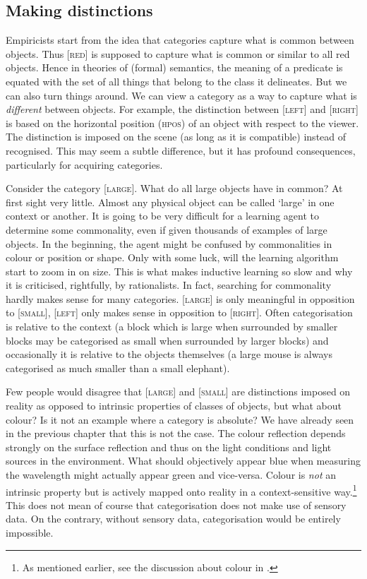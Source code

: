 \subsection{Making distinctions}

Empiricists start from the idea that categories 
capture what is common
between objects. Thus [\textsc{red}] is supposed to capture 
what is common or similar to all 
red objects. Hence in theories of 
(formal) semantics, the meaning of a predicate is 
equated with the set of all things that 
belong to the class it delineates. 
But we can also turn things around. We can 
view a category as a way to capture what is {\itshape different} 
between objects. For example, the distinction between 
[\textsc{left}] and [\textsc{right}] is based on the horizontal position (\textsc{hpos})
of an object with respect to the viewer. 
The distinction is imposed on the scene (as long as 
it is compatible) instead of 
recognised. This may seem a subtle difference, but it
has profound consequences, particularly for acquiring
categories.

Consider the category [\textsc{large}]. What do all large 
objects have in common? At first sight very little. 
Almost any physical object can be called `large' in 
one context or another. 
It is going to be very difficult for a learning agent
to determine some commonality, even if given thousands 
of examples of large objects. In the beginning, the agent
might be confused by commonalities in 
colour or position or shape. 
Only with some luck, will the learning algorithm
start to zoom in on size. 
This is what makes inductive learning so slow and 
why it is criticised, rightfully, by rationalists. 
In fact, searching for commonality hardly makes sense for
many categories. [\textsc{large}] is only meaningful in
opposition to [\textsc{small}], [\textsc{left}] only makes sense
in opposition to [\textsc{right}]. Often categorisation
is relative to the context (a block which is large when surrounded
by smaller blocks may be categorised as
small when surrounded by larger
blocks) and occasionally it is relative to the objects themselves
(a large mouse is always categorised as
much smaller than a small elephant). 

Few people would disagree that [\textsc{large}] and [\textsc{small}] are
distinctions imposed on reality as opposed to intrinsic
properties of classes of objects, but what about colour? Is it
not an example where a category is absolute? We have 
already seen in the previous chapter that this is not 
the case. The colour reflection depends strongly on the 
surface reflection and thus on the light conditions and
light sources in the environment. What should objectively 
appear blue when measuring the wavelength might actually 
appear green and vice-versa. Colour is {\itshape not}
an intrinsic property but is actively mapped onto reality
in a context-sensitive way.\footnote{
As mentioned earlier, see the discussion about colour 
in \cite{Varela:1991}.}
This does not mean of course that categorisation does not make use of sensory
data. On the contrary, without sensory data, categorisation
would be entirely impossible. 

